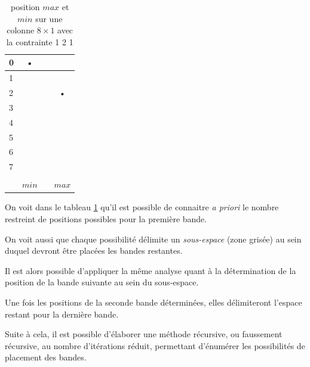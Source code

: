 \documentclass[a4paper,12pt]{report}
\newcommand\black{\cellcolor{black}}
\newcommand\grey{\cellcolor{black!50}}
\begin{document}
\begin{table}[H]
\centering
\begin{tabular}{|l||c|c|c|}
\hline 
0&\black • &  &  \\ 
\hline 
1 & &  &  \\ 
\hline 
2 & \grey &  & \black • \\ 
\hline 
3&\grey &  & \\ 
\hline 
4&\grey &  & \grey \\ 
\hline 
5&\grey &  & \grey \\ 
\hline 
6&\grey &  & \grey \\ 
\hline 
7&\grey &  & \grey \\ 
\hline &&\\
[-1.3em]\hline
&$min$ &  & $max$ \\ 
\hline 
\end{tabular} 
\caption{\label{bande8X1} position $max$ et $min$ sur une colonne $8\times1$ avec la contrainte 1 2 1}
\end{table}


On voit dans le tableau \ref{bande8X1} qu'il est possible de connaitre \textit{a priori} le nombre restreint de positions possibles pour la première bande. 

On voit aussi que chaque possibilité délimite un \textit{sous-espace} (zone grisée) au sein duquel devront être placées les bandes restantes.

Il est alors possible d'appliquer la même analyse quant à la détermination de la position de la bande suivante au sein du sous-espace.

Une fois les positions de la seconde bande déterminées, elles délimiteront l'espace restant pour la dernière bande. 

Suite à cela, il est possible d'élaborer une méthode récursive, ou faussement récursive, au nombre d'itérations réduit, permettant d'énumérer les possibilités de placement des bandes.
\end{document}

